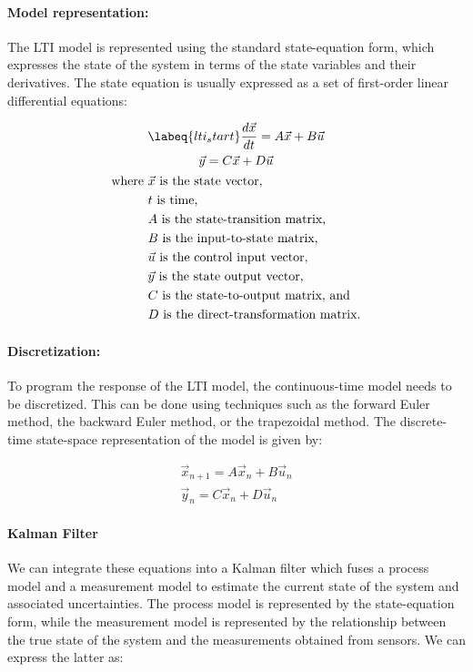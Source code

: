 \paragraph*{Model representation:} The LTI model is represented using the standard state-equation form, which expresses the state of the system in terms of the state variables and their derivatives. The state equation is usually expressed as a set of first-order linear differential equations:

\begin{gather} \labeq{lti_start}
    \frac{d\vec{x}}{dt} = A\vec{x} + B\vec{u} \\
    \vec{y} = C\vec{x} + D\vec{u} \\
    \begin{aligned}
        \text{where } & \vec{x} \text{ is the state vector,} \\
                      & t \text{ is time,} \\
                      & A \text{ is the state-transition matrix,} \\
                      & B \text{ is the input-to-state matrix,} \\
                      & \vec{u} \text{ is the control input vector,} \\
                      & \vec{y} \text{ is the state output vector,} \\
                      & C \text{ is the state-to-output matrix, and } \\
                      & D \text{ is the direct-transformation matrix}.
    \end{aligned} \notag
\end{gather}

\paragraph*{Discretization:} To program the response of the LTI model, the continuous-time model needs to be discretized. 
This can be done using techniques such as the forward Euler method, the backward Euler method, or the trapezoidal method. 
The discrete-time state-space representation of the model is given by:

\begin{gather}
    \vec{x}_{n+1} = A \vec{x}_n + B \vec{u}_n \\
    \vec{y}_n = C \vec{x}_n + D \vec{u}_n
\end{gather}
    
\paragraph*{Kalman Filter} We can integrate these equations into a Kalman filter which fuses a process model and a measurement model to estimate the current state of the system and associated uncertainties.
The process model is represented by the state-equation form, while the measurement model is represented by the relationship between the true state of the system and the measurements obtained from sensors.
We can express the latter as:

